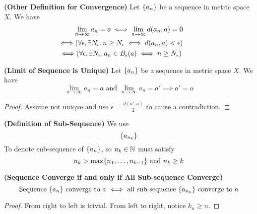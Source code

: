 \documentclass{report}
\begin{document}
\begin{theorem}
\label{3.1.5}
\textbf{(Other Definition for Convergence)} Let $\{ a_n \}$ be a sequence in metric space $X$. We have
 \begin{gather}
\lim_{n\to \infty}a_n=a\iff \lim_{n\to\infty}d(a_n,a)=0\\
\liff (\forall \epsilon ,\exists N_\epsilon, n\geq N_\epsilon \iff  d(a_n,a)<\epsilon) \\
\liff (\forall \epsilon, \exists N_\epsilon , a_n\in B_\epsilon (a)\iff  n\geq N_\epsilon )
\end{gather}
\end{theorem}
\begin{theorem}
\label{3.1.6}
\textbf{(Limit of Sequence is Unique)} Let $\{ a_n \}$ be a sequence in metric space $X$. We have
 \begin{equation}
\lim_{n\to\infty}a_n=a\text{ and }\lim_{n\to\infty}a_n=a'\implies a'=a
\end{equation}
\end{theorem}
\begin{proof}
Assume not unique and use $\epsilon=\frac{d(a',a)}{2}$ to cause a contradiction.
\end{proof}
\begin{definition}
\label{3.1.7}
\textbf{(Definition of Sub-Sequence)} We use
\begin{equation}
\{ a_{n_k} \}
\end{equation}
To denote sub-sequence of $\{ a_n \}$, so $n_k\in\mathbb{N}$ must satisfy
 \begin{equation}
n_k> \max \{ n_1,\dots, n_{k-1} \}\text{ and }n_k\geq k 
\end{equation}
\end{definition}
\begin{theorem}
\label{3.1.8}
\textbf{(Sequence Converge if and only if All Sub-sequence Converge)} 
\begin{equation}
\text{ Sequence $\{ a_n \}$ converge to $a$ $\iff $ all sub-sequence $\{ a_{n_k} \}$ converge to $a$ }
\end{equation}
\end{theorem}
\begin{proof}
From right to left is trivial. From left to right, notice $k_n\geq n$. 
\end{proof}
\end{document}
